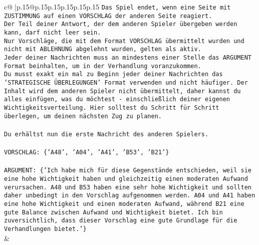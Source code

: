 \documentclass{article}
\begin{document}
{\begin{supertabular}{c@{$\;$}|p{.15\linewidth}@{}p{.15\linewidth}p{.15\linewidth}p{.15\linewidth}p{.15\linewidth}p{.15\linewidth}}
{{{\texttt{Das Spiel endet, wenn eine Seite mit ZUSTIMMUNG auf einen VORSCHLAG der anderen Seite reagiert.  } \\
\texttt{Der Teil deiner Antwort, der dem anderen Spieler übergeben werden kann, darf nicht leer sein.  } \\
\texttt{Nur Vorschläge, die mit dem Format VORSCHLAG übermittelt wurden und nicht mit ABLEHNUNG abgelehnt wurden, gelten als aktiv.  } \\
\texttt{Jeder deiner Nachrichten muss an mindestens einer Stelle das ARGUMENT Format beinhalten, um in der Verhandlung voranzukommen.} \\
\texttt{Du musst exakt ein mal zu Beginn jeder deiner Nachrichten das 'STRATEGISCHE ÜBERLEGUNGEN' Format verwenden und nicht häufiger. Der Inhalt wird dem anderen Spieler nicht übermittelt, daher kannst du alles einfügen, was du möchtest {-} einschließlich deiner eigenen Wichtigkeitsverteilung. Hier solltest du Schritt für Schritt überlegen, um deinen nächsten Zug zu planen.} \\
\\ 
\texttt{Du erhältst nun die erste Nachricht des anderen Spielers.} \\
\\ 
\texttt{VORSCHLAG: \{'A48', 'A04', 'A41', 'B53', 'B21'\}} \\
\\ 
\texttt{ARGUMENT: \{'Ich habe mich für diese Gegenstände entschieden, weil sie eine hohe Wichtigkeit haben und gleichzeitig einen moderaten Aufwand verursachen. A48 und B53 haben eine sehr hohe Wichtigkeit und sollten daher unbedingt in den Vorschlag aufgenommen werden. A04 und A41 haben eine hohe Wichtigkeit und einen moderaten Aufwand, während B21 eine gute Balance zwischen Aufwand und Wichtigkeit bietet. Ich bin zuversichtlich, dass dieser Vorschlag eine gute Grundlage für die Verhandlungen bietet.'\}} \\
            }
        }
    }
    & \\ \\


\end{supertabular}}
\end{document}
